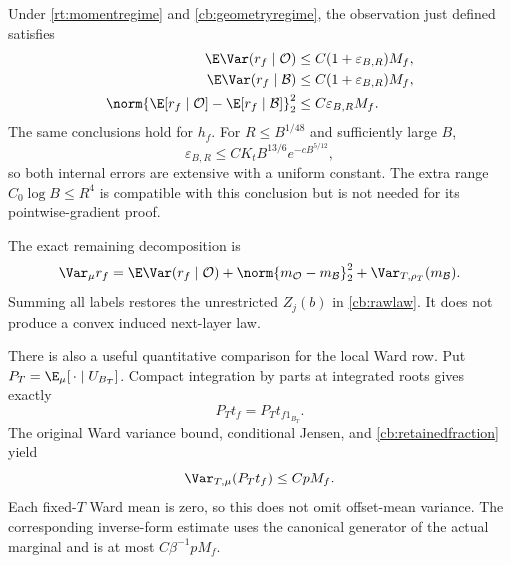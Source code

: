 \begin{theorem}
\label{cb:internal}
Under \eqref{rt:momentregime} and \eqref{cb:geometryregime}, the observation just defined satisfies
\begin{align}
 \E\Var(r_f\mid\mathcal O)&\le C(1+\varepsilon_{B,R})M_f,\notag\\
 \E\Var(r_f\mid\mathcal B)&\le C(1+\varepsilon_{B,R})M_f,\notag\\
 \norm{\E[r_f\mid\mathcal O]-\E[r_f\mid\mathcal B]}_2^2
   &\le C\varepsilon_{B,R}M_f.
 \label{cb:allbranch}
\end{align}
The same conclusions hold for \(h_f\). For \(R\le B^{1/48}\) and sufficiently large \(B\),
\[
 \varepsilon_{B,R}\le CK_tB^{13/6}e^{-cB^{5/12}},
\]
so both internal errors are extensive with a uniform constant. The extra range \(C_0\log B\le R^4\) is compatible with this conclusion but is not needed for its pointwise-gradient proof.
\end{theorem}

The exact remaining decomposition is
\begin{equation}
 \Var_\mu r_f
 =\E\Var(r_f\mid\mathcal O)
  +\norm{m_{\mathcal O}-m_{\mathcal B}}_2^2
  +\Var_{T,\rho_T}(m_{\mathcal B}).
 \label{cb:uncontrolledmean}
\end{equation}
Summing all labels restores the unrestricted \(Z_j(b)\) in \eqref{cb:rawlaw}. It does not produce a convex induced next-layer law.

There is also a useful quantitative comparison for the local Ward row. Put \(P_T=\E_\mu[\,\cdot\mid U_{B_T}]\). Compact integration by parts at integrated roots gives exactly
\[
 P_Tt_f=P_Tt_{f1_{B_T}}.
\]
The original Ward variance bound, conditional Jensen, and \eqref{cb:retainedfraction} yield
\begin{equation}
 \Var_{T,\mu}(P_Tt_f)\le CpM_f.
 \label{cb:localwardgain}
\end{equation}
Each fixed-\(T\) Ward mean is zero, so this does not omit offset-mean variance. The corresponding inverse-form estimate uses the canonical generator of the actual marginal and is at most \(C\beta^{-1}pM_f\).

